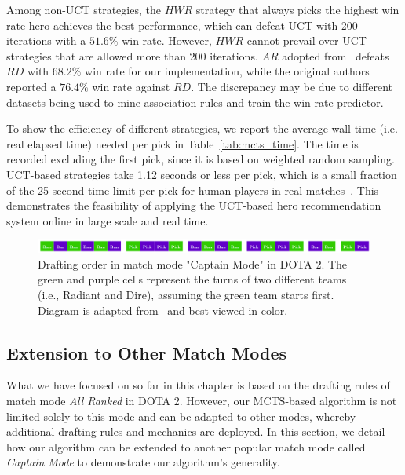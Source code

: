 Among non-UCT strategies, the $HWR$ strategy that always picks the highest win rate hero achieves the best performance, which can defeat UCT with 200 iterations with a $51.6\%$ win rate. However, $HWR$ cannot prevail over UCT strategies that are allowed more than 200 iterations. $AR$ adopted from~\cite{hanke2017reco} defeats $RD$ with $68.2\%$ win rate for our implementation, while the original authors reported a $76.4\%$ win rate against $RD$. The discrepancy may be due to different datasets being used to mine association rules and train the win rate predictor.

To show the efficiency of different strategies, we report the average wall time (i.e. real elapsed time) needed per pick in Table~\ref{tab:mcts_time}. The time is recorded excluding the first pick, since it is based on weighted random sampling. UCT-based strategies take 1.12 seconds or less per pick, which is a small fraction of the 25 second time limit per pick for human players in real matches~\cite{dotapickorder}. This demonstrates the feasibility of applying the UCT-based hero recommendation system online in large scale and real time.


\begin{figure}
\centering
\includegraphics[width=1\textwidth]{Figures/pickorder_captain_mode_my.png}
\caption{Drafting order in match mode "Captain Mode" in DOTA 2. The green and purple cells represent the turns of two different teams (i.e., Radiant and Dire), assuming the green team starts first. Diagram is adapted from~\cite{dotapickorder} and best viewed in color.}
\label{fig:pickorder_captain_mode}
\end{figure}

\subsection{Extension to Other Match Modes}\label{sec:draftart_extension}
What we have focused on so far in this chapter is based on the drafting rules of match mode \textit{All Ranked} in DOTA 2. However, our MCTS-based algorithm is not limited solely to this mode and can be adapted to other modes, whereby additional drafting rules and mechanics are deployed. In this section, we detail how our algorithm can be extended to another popular match mode called \textit{Captain Mode} to demonstrate our algorithm's generality. 

